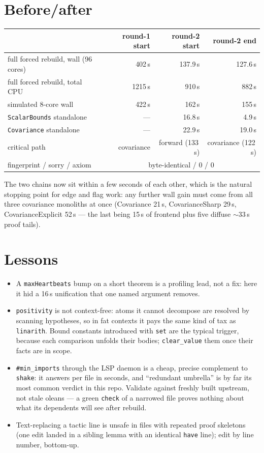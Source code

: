 \documentclass[11pt]{article}
\begin{document}
\section{Before/after}

\begin{center}
\begin{tabular}{lrrr}
\toprule
 & round-1 start & round-2 start & round-2 end \\
\midrule
full forced rebuild, wall (96 cores) & 402\,s & 137.9\,s & 127.6\,s \\
full forced rebuild, total CPU & 1215\,s & 910\,s & 882\,s \\
simulated 8-core wall & 422\,s & 162\,s & 155\,s \\
\texttt{ScalarBounds} standalone & --- & 16.8\,s & 4.9\,s \\
\texttt{Covariance} standalone & --- & 22.9\,s & 19.0\,s \\
critical path & covariance & forward (133\,s) & covariance (122\,s) \\
fingerprint / sorry / axiom & \multicolumn{3}{c}{byte-identical / 0 / 0} \\
\bottomrule
\end{tabular}
\end{center}

\noindent The two chains now sit within a few seconds of each other,
which is the natural stopping point for edge and flag work: any further
wall gain must come from all three covariance monoliths at once
(Covariance 21\,s, CovarianceSharp 29\,s, CovarianceExplicit 52\,s ---
the last being 15\,s of frontend plus five diffuse $\sim$33\,s proof
tails).

\section{Lessons}

\begin{itemize}[leftmargin=2em]
\item A \texttt{maxHeartbeats} bump on a short theorem is a profiling
lead, not a fix: here it hid a 16\,s unification that one named argument
removes.
\item \texttt{positivity} is not context-free: atoms it cannot decompose
are resolved by scanning hypotheses, so in fat contexts it pays the same
kind of tax as \texttt{linarith}. Bound constants introduced with
\texttt{set} are the typical trigger, because each comparison unfolds
their bodies; \texttt{clear\_value} them once their facts are in scope.
\item \texttt{\#min\_imports} through the LSP daemon is a cheap, precise
complement to \texttt{shake}: it answers per file in seconds, and
``redundant umbrella'' is by far its most common verdict in this repo.
Validate against freshly built upstream, not stale oleans --- a green
\texttt{check} of a narrowed file proves nothing about what its
dependents will see after rebuild.
\item Text-replacing a tactic line is unsafe in files with repeated
proof skeletons (one edit landed in a sibling lemma with an identical
\texttt{have} line); edit by line number, bottom-up.
\end{itemize}
\end{document}
